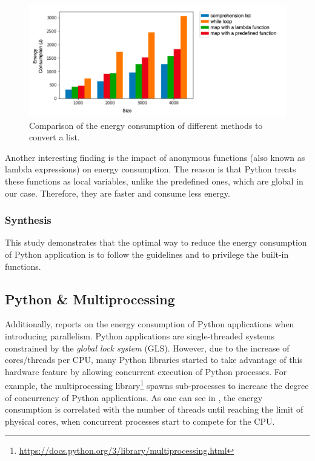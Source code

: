 \begin{figure}
    \centering
    \includegraphics[width=\linewidth]{imgs/python_treatemens}
    \caption{Comparison of the energy consumption of different methods to convert a list.}
    \label{fig:pythontreatement}
\end{figure}

Another interesting finding is the impact of anonymous functions (also known as lambda expressions) on energy consumption.
The reason is that Python treats these functions as local variables, unlike the predefined ones, which are global in our case.
Therefore, they are faster and consume less energy.

\subsubsection{Synthesis}
This study demonstrates that the optimal way to reduce the energy consumption of Python application is to follow the guidelines and to privilege the built-in functions.


\subsection{Python \& Multiprocessing}


Additionally,  reports on the energy consumption of Python applications when introducing parallelism.
Python applications are single-threaded systems constrained by the \emph{global lock system} (GLS).
However, due to the increase of cores/threads per CPU, many Python libraries started to take advantage of this hardware feature by allowing concurrent execution of Python processes.
For example, the multiprocessing library\footnote{\url{https://docs.python.org/3/library/multiprocessing.html}} spawns sub-processes to increase the degree of concurrency of Python applications.
As one can see in , the energy consumption is correlated with the number of threads until reaching the limit of physical cores, when concurrent processes start to compete for the CPU.


